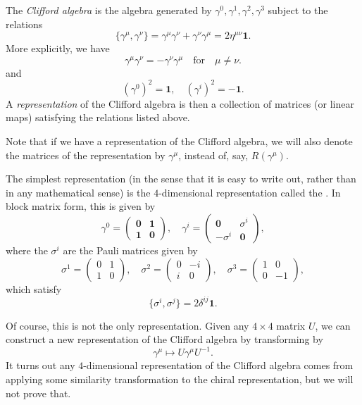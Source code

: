 \documentclass[a4paper]{article}
\begin{document}
\begin{defi}
  The \emph{Clifford algebra} is the algebra generated by $\gamma^0, \gamma^1, \gamma^2, \gamma^3$ subject to the relations
  \[
    \{\gamma^\mu, \gamma^\nu\} = \gamma^\mu \gamma^\nu + \gamma^\nu \gamma^\mu = 2 \eta^{\mu\nu}\mathbf{1}.
  \]
  More explicitly, we have
  \[
    \gamma^\mu \gamma^\nu = - \gamma^\nu \gamma^\mu\quad \text{for}\quad \mu \not= \nu.
  \]
  and
  \[
    (\gamma^0)^2 = \mathbf{1},\quad (\gamma^i)^2 = -\mathbf{1}.
  \]
  A \emph{representation} of the Clifford algebra is then a collection of matrices (or linear maps) satisfying the relations listed above.
\end{defi}
Note that if we have a representation of the Clifford algebra, we will also denote the matrices of the representation by $\gamma^\mu$, instead of, say, $R(\gamma^\mu)$.

\begin{eg}
  The simplest representation (in the sense that it is easy to write out, rather than in any mathematical sense) is the $4$-dimensional representation called the . In block matrix form, this is given by
  \[
    \gamma^0 =
    \begin{pmatrix}
      \mathbf{0} & \mathbf{1}\\
      \mathbf{1} & \mathbf{0}
    \end{pmatrix},\quad
    \gamma^i =
    \begin{pmatrix}
      \mathbf{0} & \sigma^i\\
      -\sigma^i & \mathbf{0}
    \end{pmatrix},
  \]
  where the $\sigma^i$ are the Pauli matrices given by
  \[
    \sigma^1 =
    \begin{pmatrix}
      0 & 1\\
      1 & 0
    \end{pmatrix},\quad
    \sigma^2 =
    \begin{pmatrix}
      0 & -i\\
      i & 0
    \end{pmatrix},\quad
    \sigma^3 =
    \begin{pmatrix}
      1 & 0\\
      0 & -1
    \end{pmatrix},
  \]
  which satisfy
  \[
    \{\sigma^i, \sigma^j\} = 2 \delta^{ij} \mathbf{1}.
  \]
\end{eg}
Of course, this is not the only representation. Given any $4 \times 4$ matrix $U$, we can construct a new representation of the Clifford algebra by transforming by
\[
  \gamma^\mu \mapsto U \gamma^\mu U^{-1}.
\]
It turns out any $4$-dimensional representation of the Clifford algebra comes from applying some similarity transformation to the chiral representation, but we will not prove that.
\end{document}

